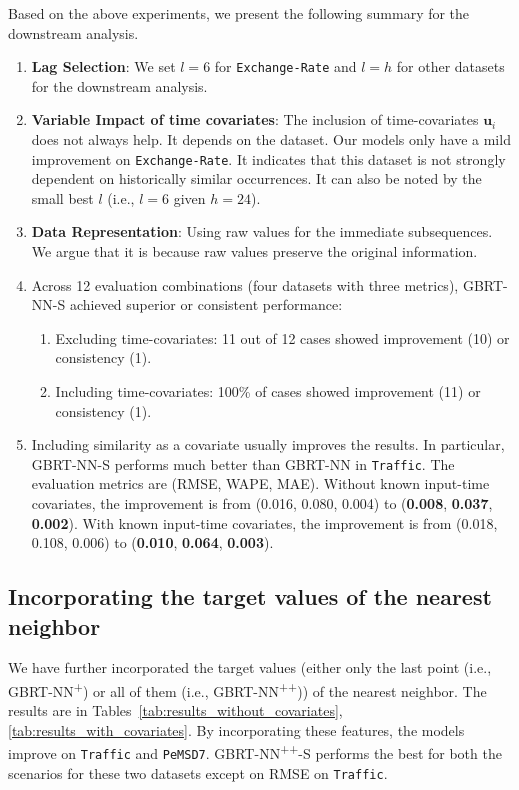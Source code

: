 Based on the above experiments, we present the following summary for the downstream analysis.
\begin{enumerate}
    \item \textbf{Lag Selection}: We set $l = 6$ for \texttt{Exchange-Rate} and $l = h$ for other datasets for the downstream analysis. 
    \item \textbf{Variable Impact of time covariates}: The inclusion of time-covariates $\bm{u}_i$ does not always help. It depends on the dataset.
    Our models only have a mild improvement on \texttt{Exchange-Rate}. It indicates that this dataset is not strongly dependent on historically similar occurrences.
    It can also be noted by the small best $l$ (i.e., $l = 6$ given $h = 24$). 
    \item \textbf{Data Representation}: Using raw values for the immediate subsequences. We argue that it is because raw values preserve the original information.
    \item Across 12 evaluation combinations (four datasets with three metrics), \textsf{GBRT-NN-S} achieved superior or consistent performance:
    \begin{enumerate}
        \item Excluding time-covariates: 11 out of 12 cases showed improvement (10) or consistency (1).
        \item Including time-covariates: 100\% of cases showed improvement (11) or consistency (1).
    \end{enumerate}
    \item Including similarity as a covariate usually improves the results.
    In particular, \textsf{GBRT-NN-S} performs much better than \textsf{GBRT-NN} in \texttt{Traffic}.
    The evaluation metrics are (RMSE, WAPE, MAE).
    Without known input-time covariates, the improvement is from (0.016, 0.080, 0.004) to (\textbf{0.008}, \textbf{0.037}, \textbf{0.002}).
    With known input-time covariates, the improvement is from (0.018, 0.108, 0.006) to (\textbf{0.010}, \textbf{0.064}, \textbf{0.003}).
\end{enumerate}

\subsection{Incorporating the target values of the nearest neighbor} %

We have further incorporated the target values (either only the last point (i.e., \textsf{GBRT-NN\textsuperscript{+}}) or all of them (i.e., \textsf{GBRT-NN\textsuperscript{++}})) of the nearest neighbor. 
The results are in Tables~\ref{tab:results_without_covariates}, \ref{tab:results_with_covariates}.
By incorporating these features, the models improve on \texttt{Traffic} and \texttt{PeMSD7}.
\textsf{GBRT-NN\textsuperscript{++}-S} performs the best for both the scenarios for these two datasets except on RMSE on \texttt{Traffic}.

